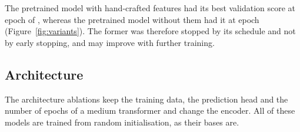 \documentclass[11pt]{article}
\begin{document}
The pretrained model with hand-crafted features had its best validation
score at epoch  of
, whereas the pretrained
model without them had it at epoch
(Figure~\ref{fig:variants}). The former was therefore stopped by its schedule
and not by early stopping, and may improve with further training.
\fi

\ifshapes
\subsection{Architecture}

The architecture ablations keep the training data, the prediction head and
the number of epochs of a medium transformer and change the encoder. All of
these models are trained from random initialisation, as their bases are.
\end{document}
